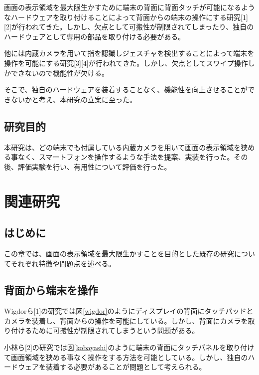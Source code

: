 \documentclass[11pt,a4j, titlepage]{jarticle} %
\begin{document}
画面の表示領域を最大限生かすために端末の背面に背面タッチが可能になるようなハードウェアを取り付けることによって背面からの端末の操作にする研究[1][2]が行われてきた。しかし、欠点として可搬性が制限されてしまったり、独自のハードウェアとして専用の部品を取り付ける必要がある。

他には内蔵カメラを用いて指を認識しジェスチャを検出することによって端末を操作を可能にする研究[3][4]が行われてきた。しかし、欠点としてスワイプ操作しかできないので機能性が欠ける。

そこで、独自のハードウェアを装着することなく、機能性を向上させることができないかと考え、本研究の立案に至った。
\subsection{研究目的}
本研究は、どの端末でも付属している内蔵カメラを用いて画面の表示領域を狭める事なく、スマートフォンを操作するような手法を提案、実装を行った。その後、評価実験を行い、有用性について評価を行った。

\newpage
\section{関連研究}
\subsection{はじめに}
この章では、画面の表示領域を最大限生かすことを目的とした既存の研究についてそれぞれ特徴や問題点を述べる。

\subsection{背面から端末を操作}
Wigdorら[1]の研究では図\ref{wigdor}のようにディスプレイの背面にタッチパッドとカメラを装着し、背面からの操作を可能にしている。しかし、背面にカメラを取り付けるために可搬性が制限されてしまうという問題がある。

小林ら[2]の研究では図\ref{kobayashi}のように端末の背面にタッチパネルを取り付けて画面領域を狭める事なく操作をする方法を可能としている。しかし、独自のハードウェアを装着する必要があることが問題として考えられる。
\end{document}
